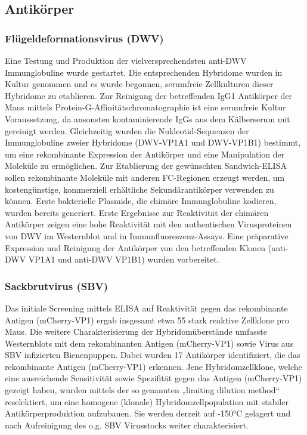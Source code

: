 \subsection{Antikörper}
\subsubsection{Flügeldeformationsvirus (DWV)}
Eine Testung und Produktion der vielversprechendsten anti-DWV Immunglobuline wurde gestartet. Die entsprechenden Hybridome wurden in Kultur genommen und es wurde begonnen, serumfreie Zellkulturen dieser Hybridome zu etablieren. Zur Reinigung der betreffenden IgG1 Antikörper der Maus mittels Protein-G-Affinitätschromatographie ist eine serumfreie Kultur Voraussetzung, da ansonsten kontaminierende IgGs aus dem Kälberserum mit gereinigt werden. Gleichzeitig wurden die Nukleotid-Sequenzen der Immunglobuline zweier Hybridome (DWV-VP1A1 und DWV-VP1B1) bestimmt, um eine rekombinante Expression der Antikörper und eine Manipulation der Moleküle zu ermöglichen. Zur Etablierung der gewünschten Sandwich-ELISA sollen rekombinante Moleküle mit anderen FC-Regionen erzeugt werden, um kostengünstige, kommerziell erhältliche Sekundärantikörper verwenden zu können. Erste bakterielle Plasmide, die chimäre Immunglobuline kodieren, wurden bereits generiert. Erste Ergebnisse zur Reaktivität der chimären Antikörper zeigen eine hohe Reaktivität mit den authentischen Virusproteinen von DWV im Westernblot und in Immunfluoreszenz-Assays. Eine präparative Expression und Reinigung der Antikörper von den betreffenden Klonen (anti-DWV VP1A1 und anti-DWV VP1B1) wurden vorbereitet.

\subsubsection{Sackbrutvirus (SBV)}
Das initiale Screening mittels ELISA auf Reaktivität gegen das rekombinante Antigen (mCherry-VP1) ergab insgesamt etwa 55 stark reaktive Zellklone pro Maus. 
Die weitere Charakterisierung der Hybridomüberstände umfasste Westernblots mit dem rekombinanten Antigen (mCherry-VP1) sowie Virus aus SBV infizierten Bienenpuppen. Dabei wurden 17 Antikörper identifiziert, die das rekombinante Antigen (mCherry-VP1) erkennen. Jene Hybridomzellklone, welche eine ausreichende Sensitivität sowie Spezifität gegen das Antigen (mCherry-VP1) gezeigt haben, wurden mittels der so genannten „limiting dilution method“ reselektiert, um eine homogene (klonale) Hybridomzellpopulation mit stabiler Antikörperproduktion aufzubauen. Sie werden derzeit auf -150°C gelagert und nach Aufreinigung des o.g. SBV Virusstocks weiter charakterisiert. 

